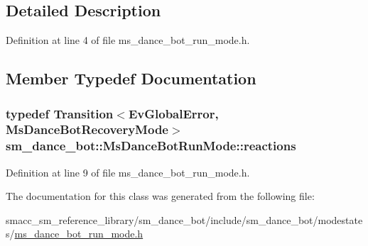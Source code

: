 \subsection{Detailed Description}


Definition at line 4 of file ms\+\_\+dance\+\_\+bot\+\_\+run\+\_\+mode.\+h.



\subsection{Member Typedef Documentation}
\subsubsection[{\texorpdfstring{reactions}{reactions}}]{\setlength{\rightskip}{0pt plus 5cm}typedef Transition$<${\bf Ev\+Global\+Error}, {\bf Ms\+Dance\+Bot\+Recovery\+Mode}$>$ {\bf sm\+\_\+dance\+\_\+bot\+::\+Ms\+Dance\+Bot\+Run\+Mode\+::reactions}}\hypertarget{classsm__dance__bot_1_1MsDanceBotRunMode_a719e14916aaff2ff6482b666f55027b7}{}\label{classsm__dance__bot_1_1MsDanceBotRunMode_a719e14916aaff2ff6482b666f55027b7}


Definition at line 9 of file ms\+\_\+dance\+\_\+bot\+\_\+run\+\_\+mode.\+h.



The documentation for this class was generated from the following file\+:\begin{DoxyCompactItemize}
\item 
smacc\+\_\+sm\+\_\+reference\+\_\+library/sm\+\_\+dance\+\_\+bot/include/sm\+\_\+dance\+\_\+bot/modestates/\hyperlink{include_2sm__dance__bot_2modestates_2ms__dance__bot__run__mode_8h}{ms\+\_\+dance\+\_\+bot\+\_\+run\+\_\+mode.\+h}\end{DoxyCompactItemize}
